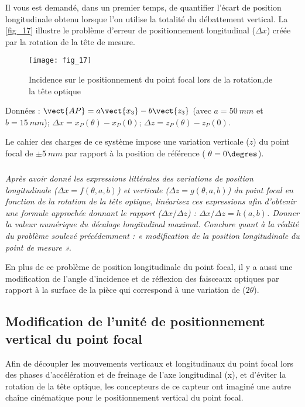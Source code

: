Il vous est demandé, dans un premier temps, de quantifier l’écart de position
longitudinale obtenu lorsque l’on utilise la totalité du débattement vertical.
La \autoref{fig_17} illustre le problème d’erreur de positionnement longitudinal ($\Delta x$) créée
par la rotation de la tête de mesure. 
\begin{figure}[H]
\centering
\texttt{[image: fig\_17]}
\caption{\label{fig_17} Incidence sur le positionnement du point focal lors de la rotation,de la tête optique}
\end{figure}

Données : 
$ \vect{AP} = a\vect{x_3}-b\vect{z_3}$ (avec $a = \SI{50}{mm}$ et $b =\SI{15}{mm}$);
$\Delta x = x_P(\theta)-x_P(0)$; $\Delta z = z_P(\theta) - z_P(0)$.

Le cahier des charges de ce système impose une variation verticale ($z$) du point
focal de $\pm \SI{5}{mm}$ par rapport à la position de référence ( $\theta = 0\degres$).

\subparagraph{\label{q_15}}\textit{
Après avoir donné les expressions littérales des variations de position longitudinale ($\Delta x = f(\theta, a, b)$)
et verticale ($\Delta z = g(\theta, a, b)$) du point focal en fonction de la rotation de la tête optique, linéarisez ces
expressions afin d’obtenir une formule approchée donnant le rapport ($\Delta x / \Delta z$) : $\Delta x / \Delta z = h(a, b)$.
Donner la valeur numérique du décalage longitudinal maximal.
Conclure quant à la réalité du problème soulevé précédemment : « modification de la position
longitudinale du point de mesure ».}
\ifprof
\begin{corrige}
\end{corrige}
\else
\fi


En plus de ce problème de position longitudinale du point focal, il y a aussi une modification de l’angle
d’incidence et de réflexion des faisceaux optiques par rapport à la surface de la pièce qui correspond à une
variation de ($2\theta$).

\subsection{Modification de l'unité de positionnement vertical du point focal}

Afin de découpler les mouvements verticaux et longitudinaux du point focal lors des phases d’accélération
et de freinage de l’axe longitudinal (x), et d’éviter la rotation de la tête optique, les concepteurs de ce
capteur ont imaginé une autre chaîne cinématique pour le positionnement vertical du point focal.

